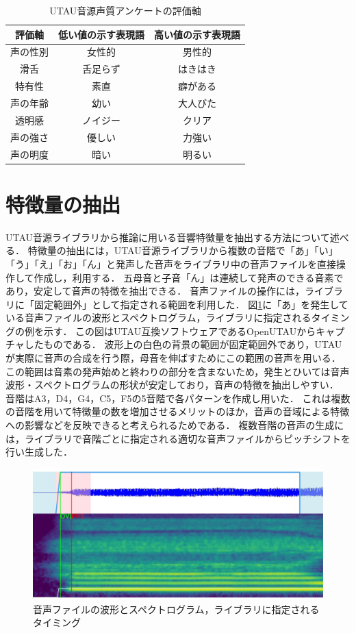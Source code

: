 \begin{table}[htb]
  \centering
  \caption{UTAU音源声質アンケートの評価軸}
  \label{tab:survey}
  \begin{tabular}{c|cc}
    \hline
    評価軸 & 低い値の示す表現語 & 高い値の示す表現語 \\
    \hline
    声の性別 & 女性的 & 男性的 \\
    滑舌 & 舌足らず & はきはき \\
    特有性 & 素直 & 癖がある \\
    声の年齢 & 幼い & 大人びた \\
    透明感 & ノイジー & クリア \\
    声の強さ & 優しい & 力強い \\
    声の明度 & 暗い & 明るい \\
    \hline
  \end{tabular}
\end{table}

\section{特徴量の抽出}
\label{sec:feature}

UTAU音源ライブラリから推論に用いる音響特徴量を抽出する方法について述べる．
特徴量の抽出には，UTAU音源ライブラリから複数の音階で「あ」「い」「う」「え」「お」「ん」と発声した音声をライブラリ中の音声ファイルを直接操作して作成し，利用する．
五母音と子音「ん」は連続して発声のできる音素であり，安定して音声の特徴を抽出できる．
音声ファイルの操作には，ライブラリに「固定範囲外」として指定される範囲を利用した．
図\ref{fig:waveform}に「あ」を発生している音声ファイルの波形とスペクトログラム，ライブラリに指定されるタイミングの例を示す．
この図はUTAU互換ソフトウェアであるOpenUTAUからキャプチャしたものである．
波形上の白色の背景の範囲が固定範囲外であり，UTAUが実際に音声の合成を行う際，母音を伸ばすためにこの範囲の音声を用いる．
この範囲は音素の発声始めと終わりの部分を含まないため，発生とひいては音声波形・スペクトログラムの形状が安定しており，音声の特徴を抽出しやすい．
音階はA3，D4，G4，C5，F5の5音階で各パターンを作成し用いた．
これは複数の音階を用いて特徴量の数を増加させるメリットのほか，音声の音域による特徴への影響などを反映できると考えられるためである．
複数音階の音声の生成には，ライブラリで音階ごとに指定される適切な音声ファイルからピッチシフトを行い生成した．

\begin{figure}[htb]
  \centering
  \includegraphics[width=0.9\linewidth]{fig/eve_a.png}
  \caption{音声ファイルの波形とスペクトログラム，ライブラリに指定されるタイミング}
  \label{fig:waveform}
\end{figure}

